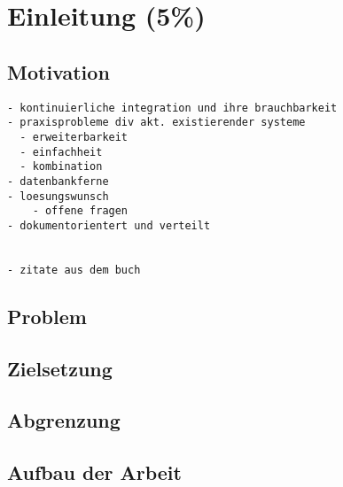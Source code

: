 \chapter{Einleitung (5\%) }

\section{Motivation}
\begin{verbatim}
- kontinuierliche integration und ihre brauchbarkeit
- praxisprobleme div akt. existierender systeme
  - erweiterbarkeit
  - einfachheit
  - kombination
- datenbankferne
- loesungswunsch
    - offene fragen
- dokumentorientert und verteilt


- zitate aus dem buch

\end{verbatim}

\section{Problem}


\section{Zielsetzung}


\section{Abgrenzung}


\section{Aufbau der Arbeit}


